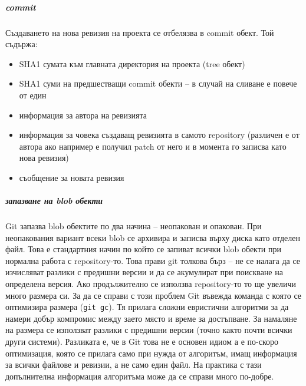 \documentclass[a4paper]{article}
\begin{document}
      \subparagraph{commit}
      Създаването на нова ревизия на проекта се отбелязва в commit обект. Той съдържа:
      \begin{itemize}
        \item SHA1 сумата към главната директория на проекта (tree обект)
        \item SHA1 суми на предшестващи commit обекти -- в случай на сливане е повече от един
        \item информация за автора на ревизията
        \item информация за човека създаващ ревизията в самото repository
        (различен е от автора ако например е получил patch от него и в момента
        го записва като нова ревизия)
        \item съобщение за новата ревизия
      \end{itemize}

      \subparagraph{запазване на blob обекти}
      Git запазва blob обектите по два начина -- неопакован и опакован. При
      неопакования вариант всеки blob се архивира и записва върху диска като
      отделен файл. Това е стандартния начин по който се запиват всички blob
      обекти при нормална работа с repository-то. Това прави git толкова бърз
      -- не се налага да се изчисляват разлики с предишни версии и да се
      акумулират при поискване на определена версия. Ако продължително се
      използва repository-то то ще увеличи много размера си. За да се справи
      с този проблем Git въвежда команда с която се оптимизира размера
      (\texttt{git gc}). Тя прилага сложни евристични алгоритми за да намери
      добър компромис между заето място и време за достъпване. За намаляне на
      размера се използват разлики с предишни версии (точно както почти всички
      други системи). Разликата е, че в Git това не е основен идиом
      а е по-скоро оптимизация, която се прилага само при нужда от алгоритъм,
      имащ информация за всички файлове и ревизии, а не само един файл. На
      практика с тази допълнителна информация алгоритъма може да се справи
      много по-добре.
\end{document}
